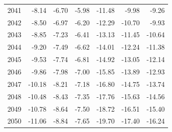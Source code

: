 \begin{table}
\begin{tabular}{lrrrrrr}
2041 & -8.14 & -6.70 & -5.98 & -11.48 & -9.98 & -9.26 \\
2042 & -8.50 & -6.97 & -6.20 & -12.29 & -10.70 & -9.93 \\
2043 & -8.85 & -7.23 & -6.41 & -13.13 & -11.45 & -10.64 \\
2044 & -9.20 & -7.49 & -6.62 & -14.01 & -12.24 & -11.38 \\
2045 & -9.53 & -7.74 & -6.81 & -14.92 & -13.05 & -12.14 \\
2046 & -9.86 & -7.98 & -7.00 & -15.85 & -13.89 & -12.93 \\
2047 & -10.18 & -8.21 & -7.18 & -16.80 & -14.75 & -13.74 \\
2048 & -10.48 & -8.43 & -7.35 & -17.76 & -15.63 & -14.56 \\
2049 & -10.78 & -8.64 & -7.50 & -18.72 & -16.51 & -15.40 \\
2050 & -11.06 & -8.84 & -7.65 & -19.70 & -17.40 & -16.24 \\
\bottomrule
\end{tabular}
\end{table}
